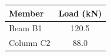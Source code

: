 \documentclass{obra}
\begin{document}
\begin{tabular}{lS[table-format=3.1]}
\toprule
Member & {Load (\si{\kilo\newton})} \\
\midrule
Beam B1 & 120.5 \\
Column C2 & 88.0 \\
\bottomrule
\end{tabular}
\end{document}
